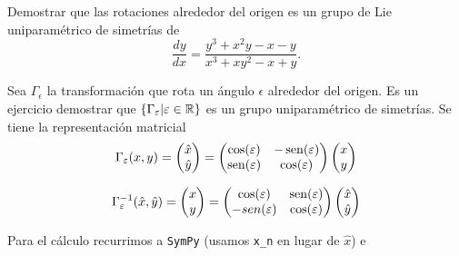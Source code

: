 \begin{ejemplo}
 Demostrar que las rotaciones alrededor del origen es un grupo de Lie uniparamétrico de simetrías de
 \[\frac{dy}{dx}=\frac{y^3+x^2y-x-y}{x^3+xy^2-x+y}.\]
\end{ejemplo}
Sea $\Gamma_{\epsilon}$ la transformación que rota un ángulo $\epsilon$ alrededor del origen. Es un ejercicio demostrar que  $\{\Gamma_{\varepsilon}|\varepsilon\in\mathbb{R}\}$ es un grupo uniparamétrico de simetrías. Se tiene la representación matricial
\[
\Gamma_{\varepsilon}(x,y)= \begin{pmatrix} \hat{x}\\ \hat{y}
\end{pmatrix}=\begin{pmatrix} \cos(\varepsilon) & -\operatorname{sen}(\varepsilon)
\\ \operatorname{sen}(\varepsilon) & \cos(\varepsilon)
\end{pmatrix} \begin{pmatrix} x\\ y
\end{pmatrix}
\]

\[
\Gamma^{-1}_{\varepsilon}(\hat{x},\hat{y})= \begin{pmatrix} x\\ y
\end{pmatrix}=\begin{pmatrix} \cos(\varepsilon) & \operatorname{sen}(\varepsilon)
\\ -sen(\varepsilon) & \cos(\varepsilon)
\end{pmatrix} \begin{pmatrix} \hat{x}\\ \hat{y}
\end{pmatrix}
\]


Para el cálculo recurrimos a \texttt{SymPy} (usamos \texttt{x\_n} en lugar de $\hat{x}$)
e
 





